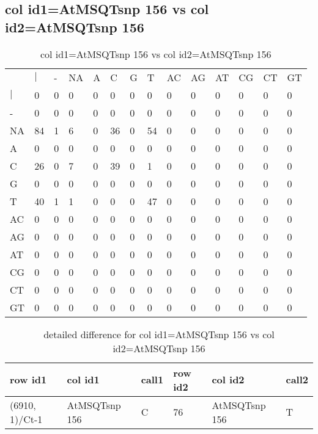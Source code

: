 \subsection{col id1=AtMSQTsnp 156 vs col id2=AtMSQTsnp 156}
\begin{center}
\begin{longtable}{|l|l|l|l|l|l|l|l|l|l|l|l|l|l|}
\caption{col id1=AtMSQTsnp 156 vs col id2=AtMSQTsnp 156} \label{table_dm736}\\
\hline
\\
\hline
&$|$&-&NA&A&C&G&T&AC&AG&AT&CG&CT&GT\\
$|$&0&0&0&0&0&0&0&0&0&0&0&0&0\\
-&0&0&0&0&0&0&0&0&0&0&0&0&0\\
NA&84&1&6&0&36&0&54&0&0&0&0&0&0\\
A&0&0&0&0&0&0&0&0&0&0&0&0&0\\
C&26&0&7&0&39&0&1&0&0&0&0&0&0\\
G&0&0&0&0&0&0&0&0&0&0&0&0&0\\
T&40&1&1&0&0&0&47&0&0&0&0&0&0\\
AC&0&0&0&0&0&0&0&0&0&0&0&0&0\\
AG&0&0&0&0&0&0&0&0&0&0&0&0&0\\
AT&0&0&0&0&0&0&0&0&0&0&0&0&0\\
CG&0&0&0&0&0&0&0&0&0&0&0&0&0\\
CT&0&0&0&0&0&0&0&0&0&0&0&0&0\\
GT&0&0&0&0&0&0&0&0&0&0&0&0&0\\
\hline
\end{longtable}
\end{center}

\begin{center}
\begin{longtable}{|l|l|l|l|l|l|}
\caption{detailed difference for col id1=AtMSQTsnp 156 vs col id2=AtMSQTsnp 156} \label{table_dm737}\\
\hline
row id1&col id1&call1&row id2&col id2&call2\\
\hline
(6910, 1)/Ct-1&AtMSQTsnp 156&C&76&AtMSQTsnp 156&T\\
\hline
\end{longtable}
\end{center}


